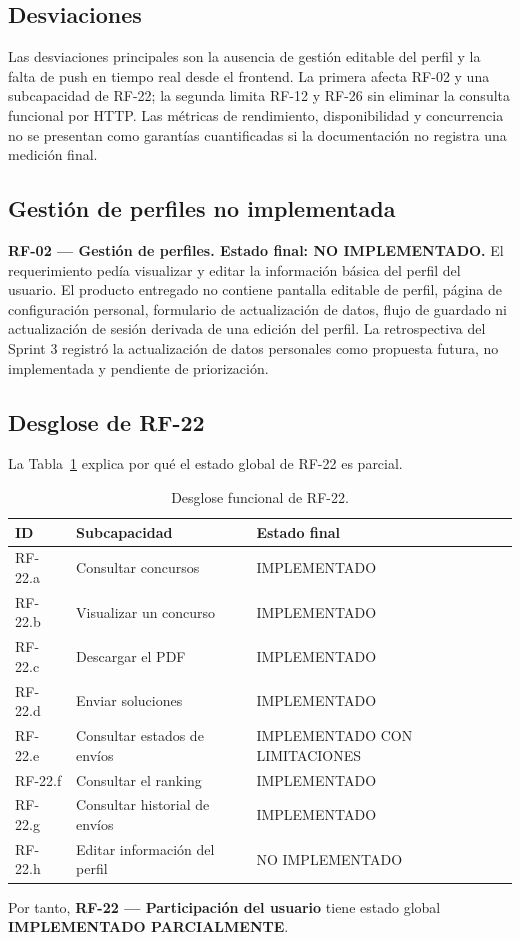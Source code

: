 \documentclass[11pt,a4paper]{article}
\newcommand{\statuspartial}{\textbf{IMPLEMENTADO PARCIALMENTE}\xspace}
\begin{document}
\subsection{Desviaciones}
Las desviaciones principales son la ausencia de gestión editable del perfil y la falta de push en tiempo real desde el frontend. La primera afecta RF-02 y una subcapacidad de RF-22; la segunda limita RF-12 y RF-26 sin eliminar la consulta funcional por HTTP. Las métricas de rendimiento, disponibilidad y concurrencia no se presentan como garantías cuantificadas si la documentación no registra una medición final.

\subsection{Gestión de perfiles no implementada}
\label{sec:rf02}
\textbf{RF-02 --- Gestión de perfiles. Estado final: NO IMPLEMENTADO.} El requerimiento pedía visualizar y editar la información básica del perfil del usuario. El producto entregado no contiene pantalla editable de perfil, página de configuración personal, formulario de actualización de datos, flujo de guardado ni actualización de sesión derivada de una edición del perfil. La retrospectiva del Sprint 3 registró la actualización de datos personales como propuesta futura, no implementada y pendiente de priorización.

\subsection{Desglose de RF-22}
La Tabla~\ref{tab:rf22} explica por qué el estado global de RF-22 es parcial.
\begin{table}[H]
\centering
\begin{tabularx}{\textwidth}{p{1.4cm}Xp{4.5cm}}
\toprule
ID & Subcapacidad & Estado final \\
\midrule
RF-22.a & Consultar concursos & IMPLEMENTADO \\
RF-22.b & Visualizar un concurso & IMPLEMENTADO \\
RF-22.c & Descargar el PDF & IMPLEMENTADO \\
RF-22.d & Enviar soluciones & IMPLEMENTADO \\
RF-22.e & Consultar estados de envíos & IMPLEMENTADO CON LIMITACIONES \\
RF-22.f & Consultar el ranking & IMPLEMENTADO \\
RF-22.g & Consultar historial de envíos & IMPLEMENTADO \\
RF-22.h & Editar información del perfil & NO IMPLEMENTADO \\
\bottomrule
\end{tabularx}
\caption{Desglose funcional de RF-22.}
\label{tab:rf22}
\end{table}
Por tanto, \textbf{RF-22 --- Participación del usuario} tiene estado global \statuspartial.
\end{document}
